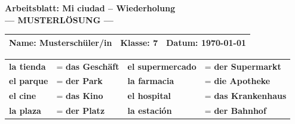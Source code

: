 \documentclass[11pt, a4paper]{article}
\newcommand{\fachfarbe}{spanisch}
\newcommand{\thema}{Mi ciudad -- Wiederholung}
\newcommand{\klasse}{7}
\newcommand{\datum}{\today}
\newcommand{\lsg}[1]{\textcolor{loesung}{\textbf{#1}}}
\newcommand{\es}[1]{\textcolor{\fachfarbe}{\textbf{#1}}}
\begin{document}
\begin{center}
    {\Large\bfseries\textcolor{\fachfarbe}{Arbeitsblatt: \thema}}\\[0.3em]
    {\large\textcolor{loesung}{\textbf{--- MUSTERLÖSUNG ---}}}
\end{center}

\vspace{5pt}

\noindent
\begin{tabularx}{\textwidth}{|X|X|X|}
\hline
\textbf{Name:} \lsg{Musterschüler/in} &
\textbf{Klasse:} \klasse &
\textbf{Datum:} \datum \\
\hline
\end{tabularx}

\vspace{15pt}


\begin{merkkasten}

\begin{tabular}{ll|ll}
\es{la tienda} & = \lsg{das Geschäft} & \es{el supermercado} & = \lsg{der Supermarkt} \\[0.5em]
\es{el parque} & = \lsg{der Park} & \es{la farmacia} & = \lsg{die Apotheke} \\[0.5em]
\es{el cine} & = \lsg{das Kino} & \es{el hospital} & = \lsg{das Krankenhaus} \\[0.5em]
\es{la plaza} & = \lsg{der Platz} & \es{la estación} & = \lsg{der Bahnhof} \\[0.5em]
\end{tabular}

\end{merkkasten}

\vspace{10pt}

\end{document}
